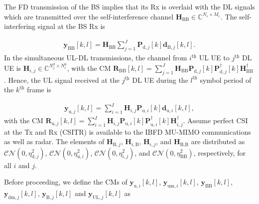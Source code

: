 \documentclass[9pt,journal]{IEEEtran}
\newcommand{\paren}[1]{\left({#1}\right)}
\newcommand{\bracket}[1]{{\left [{#1}\right ]}}
\newcommand{\braces}[1]{{\left\{ {#1}\right\}}}
\newcommand{\ith}[1]    {{#1}^{\underline{\text{th}}}}
\newcommand{\cc}{_\mathrm{c}}
\newcommand{\dui}{\mathbf{d}_{\textrm{u},i}\bracket{k,l}}
\newcommand{\PiB}{\mathbf{P}_{\textrm{u},i}\bracket{k}}
\newcommand{\PiBH}{\mathbf{P}^\dagger_{\textrm{u},i}\bracket{k}}
\newcommand{\PBj}{\mathbf{P}_{\textrm{d},j}\bracket{k}}
\newcommand{\PBjH}{\mathbf{P}^\dagger_{\textrm{d},j}\bracket{k}}
\theoremstyle{definition}
\begin{document}
The FD transmission of the BS implies that its Rx is overlaid with the DL signals which are transmitted over the self-interference channel $\mathbf{H}_{\mathrm{BB}}\in{\mathbb{C}^{\mathit{N}\cc\times \mathit{M}\cc}}$. The self-interfering signal at the BS Rx is\par\noindent\small \begin{align}
\mathbf{y}_{\mathrm{BB}}\bracket{k,l}=\mathbf{H}_{\mathrm{BB}}\sum_{j=1}^{\mathit{J}}\PBj\mathbf{d}_{\textrm{B},j}\bracket{k,l}. \label{eq:sic}
\end{align}\normalsize
In the simultaneous UL-DL transmissions, the channel from $\ith{i}$ UL UE to $\ith{j}$ DL UE is $\mathbf{H}_{i,j}\in\mathbb{C}^{\mathit{N}^{\textrm{d}}_j\times \mathit{N}^{\textrm{u}}_i}$, with the CM $\mathbf{R}_{\mathrm{BB}}\bracket{k,l}=\sum_{j=1}^{\mathit{J}}\mathbf{H}_{\mathrm{BB}}\PBj\PBjH\mathbf{H}^\dagger_\mathrm{BB}$.
Hence, the UL signal received at the $\ith{j}$ DL UE during the $\ith{l}$ symbol period of the $\ith{k}$ frame is\par\noindent\small
\begin{align}
\mathbf{y}_{\mathrm{u},j}\bracket{k,l}=\sum_{i=1}^{\mathit{I}}\mathbf{H}_{i,j}\PiB\dui,\label{eq:UL2}
\end{align}\normalsize
with the CM $\mathbf{R}_{\mathrm{u},j}\bracket{k,l}=\sum_{i=1}^{\mathit{I}}\mathbf{H}_{i,j}\PiB\PiBH\mathbf{H}^\dagger_{i,j}$. Assume perfect CSI at the Tx and Rx (CSITR) is available to the IBFD MU-MIMO communications as well as radar. The elements of $\mathbf{H}_{\textrm{B},j}$, $\mathbf{H}_{i,\textrm{B}}$, $\mathbf{H}_{i,j}$, and $\mathbf{H}_{\textrm{B,B}}$ are distributed as $\mathcal{CN}\paren{0,\eta^2_{\textrm{d},j}}$, $\mathcal{CN}\paren{0,\eta^2_{\textrm{u},i}}$, $\mathcal{CN}\paren{0,\eta^2_{i,j}}$, and $\mathcal{CN}\paren{0,\eta^2_{\textrm{BB}}}$, respectively, for all $i$ and $j$.

\iffalse
Before proceeding, we define the CMs of $\mathbf{y}_{\textrm{u},i}\bracket{k,l}$, $\mathbf{y}_{\textrm{um},i}\bracket{k,l}$, $\mathbf{y}_{\mathrm{BB}}\bracket{k,l}$, $\mathbf{y}_{\textrm{dm},j}\bracket{k,l}$, $\mathbf{y}_{\textrm{B},j}\bracket{k,l}$ and $\mathbf{y}_{\textrm{UL},j}\bracket{k,l}$ as 
\par\noindent\small
\end{document}

